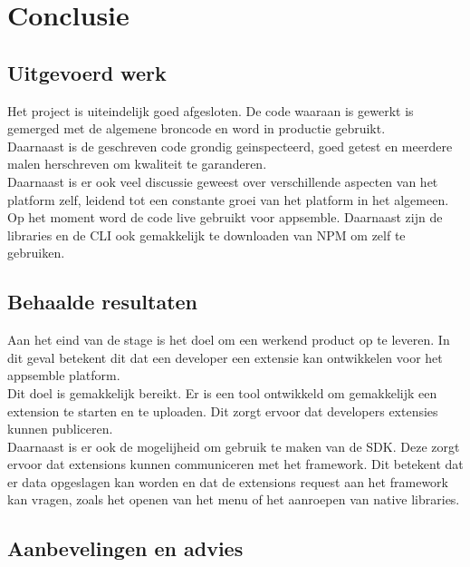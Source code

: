 \chapter{Conclusie}

\section{Uitgevoerd werk}
Het project is uiteindelijk goed afgesloten. De code waaraan is gewerkt  is gemerged met de algemene broncode en word in productie gebruikt. \\

Daarnaast is de geschreven code grondig geinspecteerd, goed getest en meerdere malen herschreven om kwaliteit te garanderen. \\

Daarnaast is er ook veel discussie geweest over verschillende aspecten van het platform zelf, leidend tot een constante groei van het platform in het algemeen. \\

Op het moment word de code live gebruikt voor appsemble. Daarnaast zijn de libraries en de CLI ook gemakkelijk te downloaden van NPM om zelf te gebruiken. 

\section{Behaalde resultaten}

Aan het eind van de stage is het doel om een werkend product op te leveren. In dit geval betekent dit dat een developer een extensie kan ontwikkelen voor het appsemble platform. \\

Dit doel is gemakkelijk bereikt. Er is een tool ontwikkeld om gemakkelijk een extension te starten en te uploaden. Dit zorgt ervoor dat developers extensies kunnen publiceren. \\

Daarnaast is er ook de mogelijheid om gebruik te maken van de SDK. Deze zorgt ervoor dat extensions kunnen communiceren met het framework. Dit betekent dat er data opgeslagen kan worden en dat de extensions request aan het framework kan vragen, zoals het openen van het menu of het aanroepen van native libraries.

\section{Aanbevelingen en advies}

